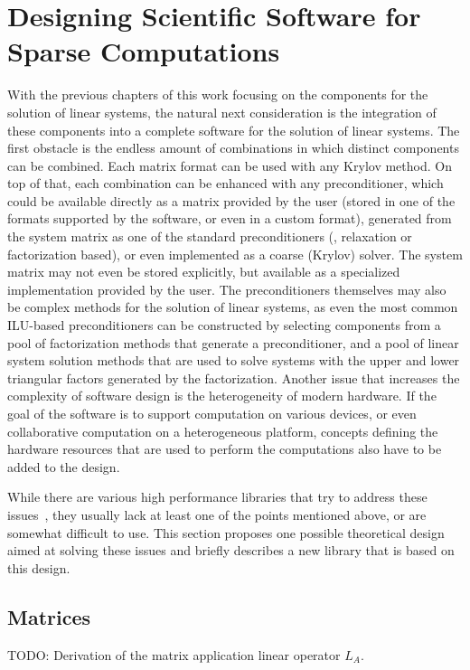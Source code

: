 \section{Designing Scientific Software for Sparse Computations}

With the previous chapters of this work focusing on the components for the
solution of linear systems, the natural next consideration is the integration of
these components into a complete software for the solution of linear systems.
The first obstacle is the endless amount of combinations in which distinct
components can be combined. Each matrix format can be used with any Krylov
method. On top of that, each combination can be enhanced with any
preconditioner, which could be available directly as a matrix provided by the
user (stored in one of the formats supported by the software, or even in a
custom format), generated from the system matrix as one of the standard
preconditioners (\eg, relaxation or factorization based), or even implemented as
a coarse (Krylov) solver. The system matrix may not even be stored explicitly,
but available as a specialized implementation provided by the user. The
preconditioners themselves may also be complex methods for the solution of
linear systems, as even the most common ILU-based preconditioners can be
constructed by selecting components from a pool of factorization methods that
generate a preconditioner, and a pool of linear system solution methods that are
used to solve systems with the upper and lower triangular factors generated by
the factorization. Another issue that increases the complexity of software
design is the heterogeneity of modern hardware. If the goal of the software is
to support computation on various devices, or even collaborative computation on
a heterogeneous platform, concepts defining the hardware resources that are used
to perform the computations also have to be added to the design.

While there are various high performance libraries that try to address these
issues~\cite{magma,vienna-cl,paralution}, they usually lack at least one of the
points mentioned above, or are somewhat difficult to use. This section proposes
one possible theoretical design aimed at solving these issues and briefly
describes a new library that is based on this design.

\subsection{Matrices}
TODO: Derivation of the matrix application linear operator $L_A$.

